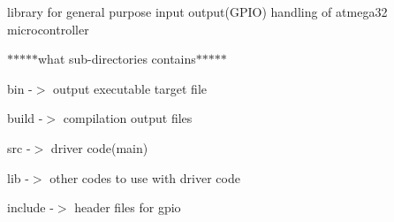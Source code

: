 \label{index_md_readme}%
%
 library for general purpose input output(\+GPIO) handling of atmega32 microcontroller

$\ast$$\ast$$\ast$$\ast$$\ast$what sub-\/directories contains$\ast$$\ast$$\ast$$\ast$$\ast$

bin -\/$>$ output executable target file

build -\/$>$ compilation output files

src -\/$>$ driver code(main)

lib -\/$>$ other codes to use with driver code

include -\/$>$ header files for gpio 